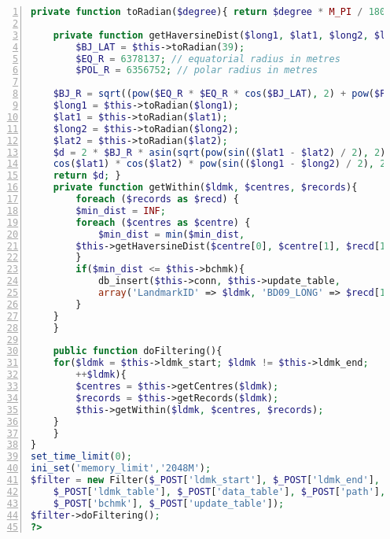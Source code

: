 \begin{lstlisting}[language = PHP, caption = {Outlier Removal}, label = {AList:outlier_rmvl}, frame=single, numbers=left, stepnumber=1]
    private function toRadian($degree){ return $degree * M_PI / 180; }
    
    private function getHaversineDist($long1, $lat1, $long2, $lat2){
        $BJ_LAT = $this->toRadian(39);
        $EQ_R = 6378137; // equatorial radius in metres
        $POL_R = 6356752; // polar radius in metres

	$BJ_R = sqrt((pow($EQ_R * $EQ_R * cos($BJ_LAT), 2) + pow($POL_R * $POL_R * sin($BJ_LAT), 2)) / (pow($EQ_R * cos($BJ_LAT), 2) + pow($EQ_R * sin($BJ_LAT), 2)));
	$long1 = $this->toRadian($long1);
	$lat1 = $this->toRadian($lat1);
	$long2 = $this->toRadian($long2);
	$lat2 = $this->toRadian($lat2);
	$d = 2 * $BJ_R * asin(sqrt(pow(sin(($lat1 - $lat2) / 2), 2) + 
	cos($lat1) * cos($lat2) * pow(sin(($long1 - $long2) / 2), 2)));
	return $d; }
    private function getWithin($ldmk, $centres, $records){
        foreach ($records as $recd) {
	    $min_dist = INF;
	    foreach ($centres as $centre) {
	        $min_dist = min($min_dist, 
		$this->getHaversineDist($centre[0], $centre[1], $recd[1], $recd[2]));
	    }
	    if($min_dist <= $this->bchmk){
	        db_insert($this->conn, $this->update_table, 
			array('LandmarkID' => $ldmk, 'BD09_LONG' => $recd[1], 'BD09_LAT' => $recd[2]));
	    }
	}
    }
    
    public function doFiltering(){
	for($ldmk = $this->ldmk_start; $ldmk != $this->ldmk_end; 
		++$ldmk){
	    $centres = $this->getCentres($ldmk);
	    $records = $this->getRecords($ldmk);
	    $this->getWithin($ldmk, $centres, $records);
	}
    }
}
set_time_limit(0);
ini_set('memory_limit','2048M');
$filter = new Filter($_POST['ldmk_start'], $_POST['ldmk_end'], 
	$_POST['ldmk_table'], $_POST['data_table'], $_POST['path'], 
	$_POST['bchmk'], $_POST['update_table']);
$filter->doFiltering();
?>
\end{lstlisting}
